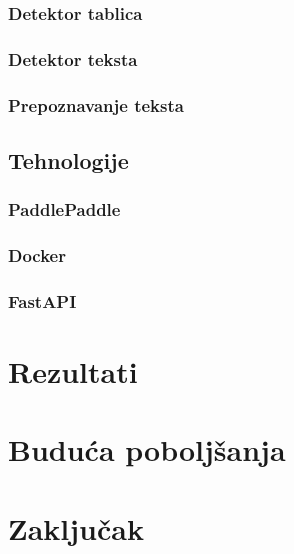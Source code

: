 \documentclass[a4paper,12pt]{article}
\begin{document}
	\subsubsection{Detektor tablica}
	\subsubsection{Detektor teksta}
	\subsubsection{Prepoznavanje teksta}
	\subsection{Tehnologije}
	\subsubsection{PaddlePaddle}
	\subsubsection{Docker}
	\subsubsection{FastAPI}
	\newpage
	
	\section{Rezultati}
	\newpage
	
	\section{Buduća poboljšanja}
	\newpage
	
	\section{Zaključak}
	\newpage
	
	\printbibliography
\end{document}
